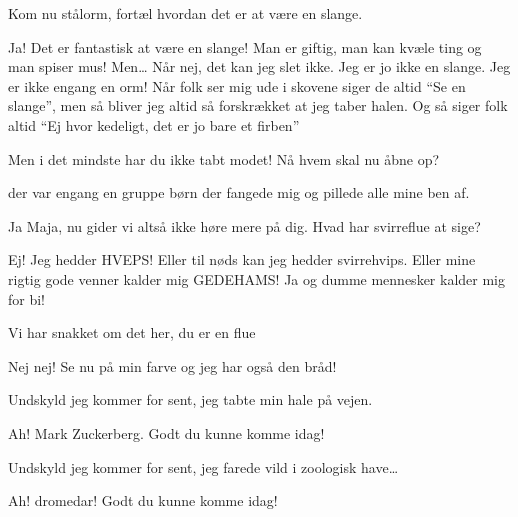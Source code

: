 \documentclass[a4paper,11pt]{article}
\begin{document}
\begin{sketch}
 Kom nu stålorm, fortæl hvordan det er at være en slange. 

 Ja! Det er fantastisk at være en slange! Man er giftig, man kan kvæle ting og man spiser mus! Men… Når nej, det kan jeg slet ikke. Jeg er jo ikke en slange. Jeg er ikke engang en orm! Når folk ser mig ude i skovene siger de altid “Se en slange”, men så bliver jeg altid så forskrækket at jeg taber halen. Og så siger folk altid “Ej hvor kedeligt, det er jo bare et firben” 

 Men i det mindste har du ikke tabt modet! Nå hvem skal nu åbne op?

 der var engang en gruppe børn der fangede mig og pillede alle mine ben af. 

 Ja Maja, nu gider vi altså ikke høre mere på dig. Hvad har svirreflue at sige? 

 Ej! Jeg hedder HVEPS! Eller til nøds kan jeg hedder svirrehvips. Eller mine rigtig gode venner kalder mig GEDEHAMS! Ja og dumme mennesker kalder mig for bi! 

 Vi har snakket om det her, du er en flue

 Nej nej! Se nu på min farve og jeg har også den bråd!

 Undskyld jeg kommer for sent, jeg tabte min hale på vejen.

 Ah! Mark Zuckerberg. Godt du kunne komme idag! 


 Undskyld jeg kommer for sent, jeg farede vild i zoologisk have…

 Ah! dromedar! Godt du kunne komme idag!



\end{sketch}
\end{document}
